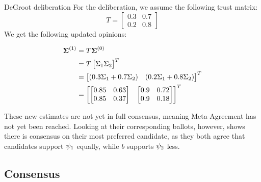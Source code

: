 \begin{example}{DeGroot deliberation} {}
	For the deliberation, we assume the following trust matrix:
	\[
		T= \begin{bmatrix}
			0.3 & 0.7 \\
			0.2 & 0.8
		\end{bmatrix}
	\]
	We get the following updated opinions:

	\begin{align*}
		\boldsymbol{\boldsymbol{\Sigma}}^{(1)}
		 & =
		T\boldsymbol{\boldsymbol{\Sigma}}^{(0)}
		\\ &
		=T\begin{bmatrix}\Sigma_1
			  \Sigma_2\end{bmatrix}^{T}
		\\ &
		=\begin{bmatrix}(0.3\Sigma_1
			 + 0.7\Sigma_{2}) &
			 (0.2\Sigma_1 +
			 0.8\Sigma_{2})\end{bmatrix}^{T} \\
		 & = \begin{bmatrix}
			     \begin{bmatrix}
				0.85 & 0.63
				\\
				0.85 & 0.37\end{bmatrix}
			      &
			     \begin{bmatrix}
				0.9 & 0.72
				\\ 0.9 & 0.18 \\
			\end{bmatrix}
		     \end{bmatrix}^{T}
	\end{align*}

	These new estimates are not yet in full consensus, meaning Meta-Agreement has not yet been reached.  Looking at their
	corresponding ballots, however, shows there is consensus on their most preferred candidate,
	as they both agree that candidates support $\psi_1$ equally, while $b$
	supports $\psi_2$ less.

	\label{example:deGroot-delib}
\end{example}


\subsection{Consensus} \label{sub: concensus DeGroot}


